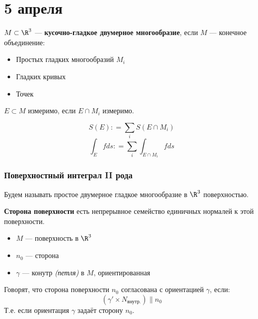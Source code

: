 \chapter{5 апреля}

\begin{definition}
    \(M \subset \R^3\) --- \textbf{кусочно-гладкое двумерное многообразие}, если \(M\) --- конечное объединение:
    \begin{itemize}
        \item Простых гладких многообразий \(M_i\)
        \item Гладких кривых
        \item Точек
    \end{itemize}
\end{definition}

\begin{definition}
    \(E \subset M\) измеримо, если \(E \cap M_i\) измеримо.

    \[S(E) : = \sum_i S(E \cap M_i)\]
    \[\int_E fds : = \sum_i \int_{E\cap M_i} f ds\]
\end{definition}

\subsection{Поверхностный интеграл II рода}

\begin{obozn}
    Будем называть простое двумерное гладкое многообразие в \(\R^3\) поверхностью.
\end{obozn}

\begin{definition}
    \textbf{Сторона поверхности} есть непрерывное семейство единичных нормалей к этой поверхности.
\end{definition}

\begin{definition}\itemfix
    \begin{itemize}
        \item \(M\) --- поверхность в \(\R^3\)
        \item \(n_0\) --- сторона %
        \item \(\gamma\) --- конутр \textit{(петля)} в \(M\), ориентированная
    \end{itemize}

    Говорят, что сторона поверхности \(n_0\) согласована с ориентацией \(\gamma\), если:
    \[(\gamma' \times N_{\text{внутр.}}) \parallel n_0\]
    Т.е. если ориентация \(\gamma\) задаёт сторону \(n_0\).
\end{definition}

